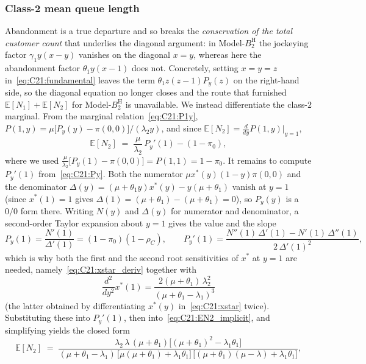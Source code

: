 \documentclass{article}
\numberwithin{equation}{section}
\newcommand{\BH}{B_2^{\mathrm{H}}}
\begin{document}
\subsubsection{Class-2 mean queue length}

Abandonment is a true departure and so breaks the \emph{conservation of the total customer
count} that underlies the diagonal argument: in Model-$\BH$ the jockeying factor
$\gamma_1 y(x-y)$ vanishes on the diagonal $x=y$, whereas here the abandonment factor
$\theta_1 y(x-1)$ does not. Concretely, setting $x=y=z$ in~\eqref{eq:C21:fundamental} leaves
the term $\theta_1 z(z-1)P_y(z)$ on the right-hand side, so the diagonal equation no longer
closes and the route that furnished $\mathbb{E}[N_1]+\mathbb{E}[N_2]$ for Model-$\BH$ is
unavailable. We instead differentiate the class-$2$ marginal. From the
marginal relation~\eqref{eq:C21:P1y}, $P(1,y)=\mu\bigl[P_y(y)-\pi(0,0)\bigr]/(\lambda_2 y)$,
and since $\mathbb{E}[N_2]=\tfrac{d}{dy}P(1,y)\big|_{y=1}$,
\begin{equation}
    \mathbb{E}[N_2]
    \;=\; \frac{\mu}{\lambda_2}\,P_y'(1) - (1-\pi_0),
    \label{eq:C21:EN2_implicit}
\end{equation}
where we used $\tfrac{\mu}{\lambda_2}\bigl[P_y(1)-\pi(0,0)\bigr]=P(1,1)=1-\pi_0$. It remains
to compute $P_y'(1)$ from~\eqref{eq:C21:Py}. Both the numerator $\mu x^*(y)(1-y)\pi(0,0)$ and
the denominator $\Delta(y)=(\mu+\theta_1 y)x^*(y)-y(\mu+\theta_1)$ vanish at $y=1$ (since
$x^*(1)=1$ gives $\Delta(1)=(\mu+\theta_1)-(\mu+\theta_1)=0$), so $P_y(y)$ is a $0/0$ form
there. Writing $N(y)$ and $\Delta(y)$ for numerator and denominator, a second-order Taylor
expansion about $y=1$ gives the value and the slope
\begin{equation*}
    P_y(1) = \frac{N'(1)}{\Delta'(1)} = (1-\pi_0)(1-\rho_C),
    \qquad
    P_y'(1) = \frac{N''(1)\,\Delta'(1) - N'(1)\,\Delta''(1)}{2\,\Delta'(1)^2},
\end{equation*}
which is why both the first and the second root sensitivities of $x^*$ at $y=1$ are needed,
namely~\eqref{eq:C21:xstar_deriv} together with
\begin{equation*}
    \frac{d^2}{dy^2}x^*(1) = \frac{2(\mu+\theta_1)\,\lambda_2^2}{(\mu+\theta_1-\lambda_1)^3}
\end{equation*}
(the latter obtained by differentiating $x^*(y)$ in~\eqref{eq:C21:xstar} twice).
Substituting these into $P_y'(1)$, then into~\eqref{eq:C21:EN2_implicit}, and simplifying
yields the closed form
\begin{equation}
    \mathbb{E}[N_2]
    \;=\; \frac{\lambda_2\,\lambda\,(\mu+\theta_1)\bigl[(\mu+\theta_1)^2-\lambda_1\theta_1\bigr]}
               {(\mu+\theta_1-\lambda_1)\,
                \bigl[\mu(\mu+\theta_1)+\lambda_1\theta_1\bigr]\,
                \bigl[(\mu+\theta_1)(\mu-\lambda)+\lambda_1\theta_1\bigr]},
    \label{eq:C21:EN2}
\end{equation}
\end{document}
